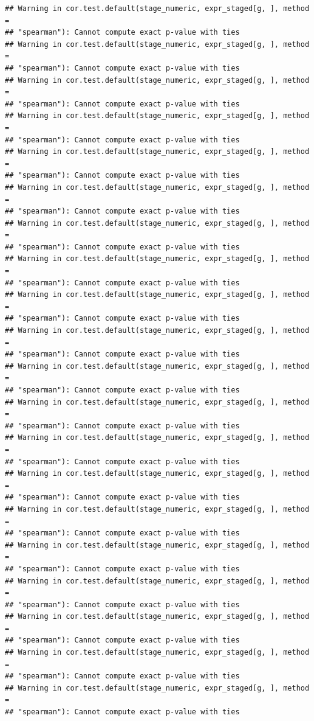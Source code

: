 \documentclass[
]{article}
\begin{document}
\begin{verbatim}
## Warning in cor.test.default(stage_numeric, expr_staged[g, ], method =
## "spearman"): Cannot compute exact p-value with ties
## Warning in cor.test.default(stage_numeric, expr_staged[g, ], method =
## "spearman"): Cannot compute exact p-value with ties
## Warning in cor.test.default(stage_numeric, expr_staged[g, ], method =
## "spearman"): Cannot compute exact p-value with ties
## Warning in cor.test.default(stage_numeric, expr_staged[g, ], method =
## "spearman"): Cannot compute exact p-value with ties
## Warning in cor.test.default(stage_numeric, expr_staged[g, ], method =
## "spearman"): Cannot compute exact p-value with ties
## Warning in cor.test.default(stage_numeric, expr_staged[g, ], method =
## "spearman"): Cannot compute exact p-value with ties
## Warning in cor.test.default(stage_numeric, expr_staged[g, ], method =
## "spearman"): Cannot compute exact p-value with ties
## Warning in cor.test.default(stage_numeric, expr_staged[g, ], method =
## "spearman"): Cannot compute exact p-value with ties
## Warning in cor.test.default(stage_numeric, expr_staged[g, ], method =
## "spearman"): Cannot compute exact p-value with ties
## Warning in cor.test.default(stage_numeric, expr_staged[g, ], method =
## "spearman"): Cannot compute exact p-value with ties
## Warning in cor.test.default(stage_numeric, expr_staged[g, ], method =
## "spearman"): Cannot compute exact p-value with ties
## Warning in cor.test.default(stage_numeric, expr_staged[g, ], method =
## "spearman"): Cannot compute exact p-value with ties
## Warning in cor.test.default(stage_numeric, expr_staged[g, ], method =
## "spearman"): Cannot compute exact p-value with ties
## Warning in cor.test.default(stage_numeric, expr_staged[g, ], method =
## "spearman"): Cannot compute exact p-value with ties
## Warning in cor.test.default(stage_numeric, expr_staged[g, ], method =
## "spearman"): Cannot compute exact p-value with ties
## Warning in cor.test.default(stage_numeric, expr_staged[g, ], method =
## "spearman"): Cannot compute exact p-value with ties
## Warning in cor.test.default(stage_numeric, expr_staged[g, ], method =
## "spearman"): Cannot compute exact p-value with ties
## Warning in cor.test.default(stage_numeric, expr_staged[g, ], method =
## "spearman"): Cannot compute exact p-value with ties
## Warning in cor.test.default(stage_numeric, expr_staged[g, ], method =
## "spearman"): Cannot compute exact p-value with ties
## Warning in cor.test.default(stage_numeric, expr_staged[g, ], method =
## "spearman"): Cannot compute exact p-value with ties
\end{verbatim}
\end{document}
